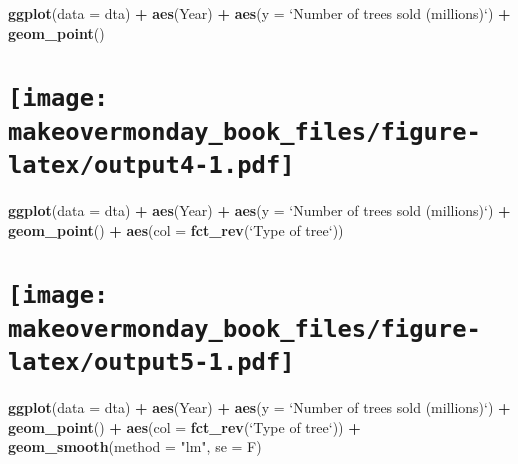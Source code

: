 \documentclass[]{book}
\newenvironment{Shaded}{\begin{snugshade}}{\end{snugshade}}
\newcommand{\KeywordTok}[1]{\textcolor[rgb]{0.13,0.29,0.53}{\textbf{#1}}}
\newcommand{\DataTypeTok}[1]{\textcolor[rgb]{0.13,0.29,0.53}{#1}}
\newcommand{\StringTok}[1]{\textcolor[rgb]{0.31,0.60,0.02}{#1}}
\newcommand{\OperatorTok}[1]{\textcolor[rgb]{0.81,0.36,0.00}{\textbf{#1}}}
\newcommand{\NormalTok}[1]{#1}
\theoremstyle{definition}
\theoremstyle{definition}
\theoremstyle{definition}
\theoremstyle{remark}
\begin{document}
\begin{Shaded}
\begin{Highlighting}[]
\KeywordTok{ggplot}\NormalTok{(}\DataTypeTok{data =}\NormalTok{ dta) }\OperatorTok{+}
\StringTok{  }\KeywordTok{aes}\NormalTok{(Year) }\OperatorTok{+}
\StringTok{  }\KeywordTok{aes}\NormalTok{(}\DataTypeTok{y =} \StringTok{`}\DataTypeTok{Number of trees sold (millions)}\StringTok{`}\NormalTok{) }\OperatorTok{+}
\StringTok{  }\KeywordTok{geom_point}\NormalTok{() }
\end{Highlighting}
\end{Shaded}

\section[]{\texorpdfstring{\protect\texttt{[image: makeovermonday\_book\_files/figure-latex/output4-1.pdf]}}{}}\label{section-13}

\clearpage

\begin{Shaded}
\begin{Highlighting}[]
\KeywordTok{ggplot}\NormalTok{(}\DataTypeTok{data =}\NormalTok{ dta) }\OperatorTok{+}
\StringTok{  }\KeywordTok{aes}\NormalTok{(Year) }\OperatorTok{+}
\StringTok{  }\KeywordTok{aes}\NormalTok{(}\DataTypeTok{y =} \StringTok{`}\DataTypeTok{Number of trees sold (millions)}\StringTok{`}\NormalTok{) }\OperatorTok{+}
\StringTok{  }\KeywordTok{geom_point}\NormalTok{() }\OperatorTok{+}
\StringTok{  }\KeywordTok{aes}\NormalTok{(}\DataTypeTok{col =} \KeywordTok{fct_rev}\NormalTok{(}\StringTok{`}\DataTypeTok{Type of tree}\StringTok{`}\NormalTok{)) }
\end{Highlighting}
\end{Shaded}

\section[]{\texorpdfstring{\protect\texttt{[image: makeovermonday\_book\_files/figure-latex/output5-1.pdf]}}{}}\label{section-14}

\clearpage

\begin{Shaded}
\begin{Highlighting}[]
\KeywordTok{ggplot}\NormalTok{(}\DataTypeTok{data =}\NormalTok{ dta) }\OperatorTok{+}
\StringTok{  }\KeywordTok{aes}\NormalTok{(Year) }\OperatorTok{+}
\StringTok{  }\KeywordTok{aes}\NormalTok{(}\DataTypeTok{y =} \StringTok{`}\DataTypeTok{Number of trees sold (millions)}\StringTok{`}\NormalTok{) }\OperatorTok{+}
\StringTok{  }\KeywordTok{geom_point}\NormalTok{() }\OperatorTok{+}
\StringTok{  }\KeywordTok{aes}\NormalTok{(}\DataTypeTok{col =} \KeywordTok{fct_rev}\NormalTok{(}\StringTok{`}\DataTypeTok{Type of tree}\StringTok{`}\NormalTok{)) }\OperatorTok{+}
\StringTok{  }\KeywordTok{geom_smooth}\NormalTok{(}\DataTypeTok{method =} \StringTok{"lm"}\NormalTok{, }\DataTypeTok{se =}\NormalTok{ F) }
\end{Highlighting}
\end{Shaded}
\end{document}
